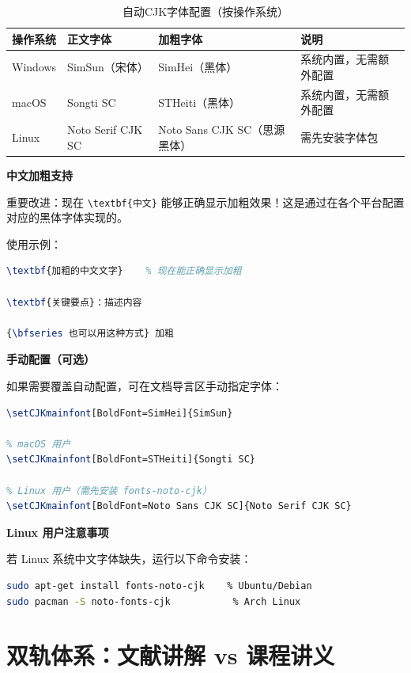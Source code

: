 \begin{table}[!h]
\centering
\caption{自动CJK字体配置（按操作系统）}
\label{tab:auto-cjk-fonts}
\begin{tabular}{p{2cm}p{3cm}p{3cm}p{3cm}}
\toprule
\textbf{操作系统} & \textbf{正文字体} & \textbf{加粗字体} & \textbf{说明} \\
\midrule
Windows & SimSun（宋体） & SimHei（黑体） & 系统内置，无需额外配置 \\
macOS & Songti SC & STHeiti（黑体） & 系统内置，无需额外配置 \\
Linux & Noto Serif CJK SC & Noto Sans CJK SC（思源黑体） & 需先安装字体包 \\
\bottomrule
\end{tabular}
\end{table}

\textbf{中文加粗支持}

重要改进：现在 \lstinline|\textbf{中文}| 能够正确显示加粗效果！这是通过在各个平台配置对应的黑体字体实现的。

使用示例：

\begin{lstlisting}[style=blockstyle,language=TeX]
\textbf{加粗的中文文字}    % 现在能正确显示加粗

\textbf{关键要点}：描述内容

{\bfseries 也可以用这种方式} 加粗
\end{lstlisting}

\textbf{手动配置（可选）}

如果需要覆盖自动配置，可在文档导言区手动指定字体：

\begin{lstlisting}[style=blockstyle,language=TeX]
% Windows 用户
\setCJKmainfont[BoldFont=SimHei]{SimSun}

% macOS 用户
\setCJKmainfont[BoldFont=STHeiti]{Songti SC}

% Linux 用户（需先安装 fonts-noto-cjk）
\setCJKmainfont[BoldFont=Noto Sans CJK SC]{Noto Serif CJK SC}
\end{lstlisting}

\textbf{Linux 用户注意事项}

若 Linux 系统中文字体缺失，运行以下命令安装：

\begin{lstlisting}[style=blockstyle,language=bash]
sudo apt-get install fonts-noto-cjk    % Ubuntu/Debian
sudo pacman -S noto-fonts-cjk           % Arch Linux
\end{lstlisting}


\section{双轨体系：文献讲解 vs 课程讲义}

